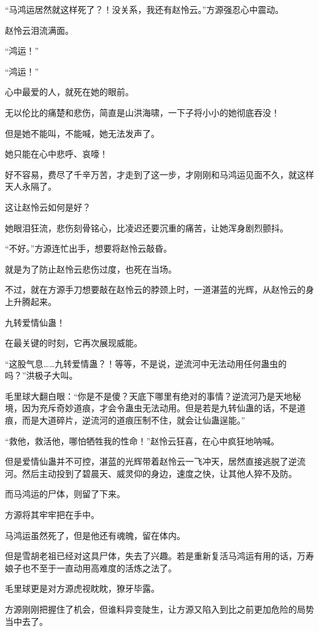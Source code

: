 \begin{this_body}
“马鸿运居然就这样死了？！没关系，我还有赵怜云。”方源强忍心中震动。

赵怜云泪流满面。

“鸿运！”

“鸿运！”

心中最爱的人，就死在她的眼前。

无以伦比的痛楚和悲伤，简直是山洪海啸，一下子将小小的她彻底吞没！

但是她不能叫，不能喊，她无法发声了。

她只能在心中悲呼、哀嚎！

好不容易，费尽了千辛万苦，才走到了这一步，才刚刚和马鸿运见面不久，就这样天人永隔了。

这让赵怜云如何是好？

她眼泪狂流，悲伤刻骨铭心，比凌迟还要沉重的痛苦，让她浑身剧烈颤抖。

“不好。”方源连忙出手，想要将赵怜云敲昏。

就是为了防止赵怜云悲伤过度，也死在当场。

不过，就在方源手刀想要敲在赵怜云的脖颈上时，一道湛蓝的光辉，从赵怜云的身上升腾起来。

九转爱情仙蛊！

在最关键的时刻，它再次展现威能。

“这股气息……九转爱情蛊？！等等，不是说，逆流河中无法动用任何蛊虫的吗？”洪极子大叫。

毛里球大翻白眼：“你是不是傻？天底下哪里有绝对的事情？逆流河乃是天地秘境，因为充斥奇妙道痕，才会令蛊虫无法动用。但是若是九转仙蛊的话，不是道痕，而是大道碎片，逆流河的道痕压制不住，就会让仙蛊逞能。”

“救他，救活他，哪怕牺牲我的性命！”赵怜云狂喜，在心中疯狂地呐喊。

但是爱情仙蛊并不可控，湛蓝的光辉带着赵怜云一飞冲天，居然直接逃脱了逆流河。然后主动投到了碧晨天、威灵仰的身边，速度之快，让其他人猝不及防。

而马鸿运的尸体，则留了下来。

方源将其牢牢把在手中。

马鸿运虽然死了，但是他还有魂魄，留在体内。

但是雪胡老祖已经对这具尸体，失去了兴趣。若是重新复活马鸿运有用的话，万寿娘子也不至于一直动用高难度的活炼之法了。

毛里球更是对方源虎视眈眈，獠牙毕露。

方源刚刚把握住了机会，但谁料异变陡生，让方源又陷入到比之前更加危险的局势当中去了。


\end{this_body}
